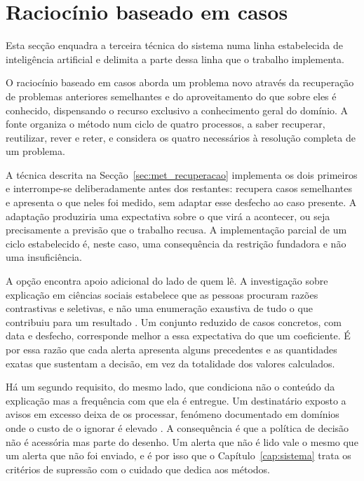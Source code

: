 \section{Raciocínio baseado em casos}
\label{sec:ctx_casos}

Esta secção enquadra a terceira técnica do sistema numa linha estabelecida de inteligência
artificial e delimita a parte dessa linha que o trabalho implementa.

O raciocínio baseado em casos \autocite{aamodt1994cbr} aborda um problema novo através da
recuperação de problemas anteriores semelhantes e do aproveitamento do que sobre eles é conhecido,
dispensando o recurso exclusivo a conhecimento geral do domínio. A fonte organiza o método num
ciclo de quatro processos, a saber recuperar, reutilizar, rever e reter, e considera os quatro
necessários à resolução completa de um problema.

A técnica descrita na Secção~\ref{sec:met_recuperacao} implementa os dois primeiros e interrompe-se
deliberadamente antes dos restantes: recupera casos semelhantes e apresenta o que neles foi medido,
sem adaptar esse desfecho ao caso presente. A adaptação produziria uma expectativa sobre o que virá
a acontecer, ou seja precisamente a previsão que o trabalho recusa. A implementação parcial de um
ciclo estabelecido é, neste caso, uma consequência da restrição fundadora e não uma insuficiência.

A opção encontra apoio adicional do lado de quem lê. A investigação sobre explicação em ciências
sociais estabelece que as pessoas procuram razões contrastivas e seletivas, e não uma enumeração
exaustiva de tudo o que contribuiu para um resultado \autocite{miller2019explanation}. Um conjunto
reduzido de casos concretos, com data e desfecho, corresponde melhor a essa expectativa do que um
coeficiente. É por essa razão que cada alerta apresenta alguns precedentes e as quantidades exatas
que sustentam a decisão, em vez da totalidade dos valores calculados.

Há um segundo requisito, do mesmo lado, que condiciona não o conteúdo da explicação mas a frequência
com que ela é entregue. Um destinatário exposto a avisos em excesso deixa de os processar, fenómeno
documentado em domínios onde o custo de o ignorar é elevado \autocite{ancker2017alertfatigue}. A consequência é que a política de decisão não é acessória mas parte do desenho. Um alerta que não
é lido vale o mesmo que um alerta que não foi enviado, e é por isso que o
Capítulo~\ref{cap:sistema} trata os critérios de supressão com o cuidado que dedica aos métodos.

